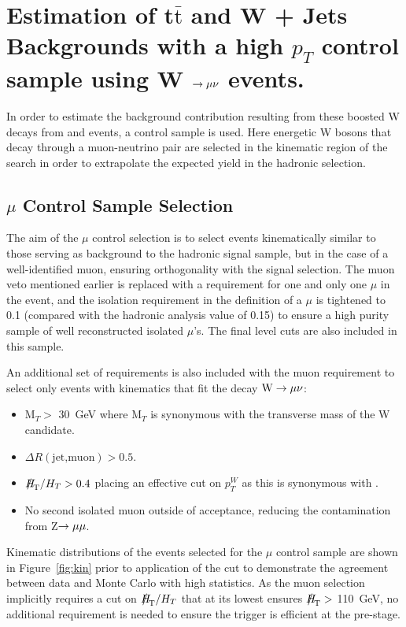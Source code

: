 \section{Estimation of t$\bar{\textrm{t}}$ and W + Jets Backgrounds with a high $p_{T}$ control sample using W $\rightarrow \mu \nu$ events.}

In order to estimate the background contribution resulting from these boosted W decays from \wj and \ttj events, a control sample is used. Here energetic W bosons that decay through a muon-neutrino pair are selected in the kinematic region of the search in order to extrapolate the expected yield in the hadronic selection.
\subsection{$\mu$ Control Sample Selection}

The aim of the $\mu$ control selection is to select events kinematically similar to those serving as background to the hadronic signal sample, but in the case of a well-identified muon, ensuring orthogonality with the signal selection. The muon veto mentioned earlier is replaced with a requirement for one and only one $\mu$ in the event, and the isolation requirement in the definition of a $\mu$ is tightened to 0.1 (compared with the hadronic analysis value of 0.15) to ensure a high purity sample of well reconstructed isolated $\mu$'s. The final level cuts are also included in this sample.

An additional set of requirements is also included with the muon requirement to select only events with kinematics that fit the decay $\textrm{W} \rightarrow \mu \nu$:
\begin{itemize}
\item M$_{T} >$ 30~GeV where M$_{T}$ is synonymous with the transverse mass of the W candidate.
\item $\Delta R(\textrm{jet,muon}) > 0.5$.
\item $\MHT / \HT > 0.4$ placing an effective cut on $p_{T}^{W}$ as this is synonymous with \MHT.
\item No second isolated muon outside of acceptance, reducing the contamination from Z$ \rightarrow \mu \mu$.
\end{itemize}

Kinematic distributions of the events selected for the $\mu$ control sample are shown in Figure~\ref{fig:kin} prior to application of the \alt cut to demonstrate the agreement between data and Monte Carlo with high statistics. As the muon selection implicitly requires a cut on $\MHT / \HT$ that at its lowest ensures $\MHT >$ 110~GeV, no additional requirement is needed to ensure the trigger is efficient at the pre-\alt stage.

